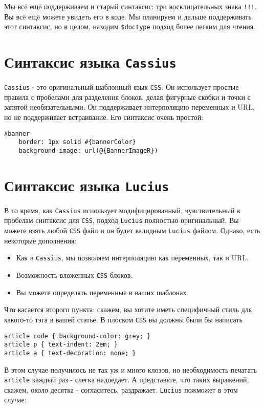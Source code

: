 Мы всë ещë поддерживаем и старый синтаксис: три восклицательных знака \texttt{!!!}.
Вы всë ещë можете увидеть его в коде. Мы планируем и дальше поддерживать этот
синтаксис, но в целом, находим \lstinline!$doctype! подход более легким для чтения.

\section{Синтаксис языка \texttt{Cassius}}
\texttt{Cassius} - это оригинальный шаблонный язык \texttt{CSS}. Он использует простые правила
с пробелами для разделения блоков, делая фигурные скобки и точки с запятой
необязательными. Он поддерживает интерполяцию переменных и URL, но не поддерживает
встраивание. Его синтаксис очень простой:

\begin{lstlisting}
#banner
    border: 1px solid #{bannerColor}
    background-image: url(@{BannerImageR})
\end{lstlisting}

\section{Синтаксис языка \texttt{Lucius}}
В то время, как \texttt{Cassius} использует модифицированный, чувствительный к пробелам
синтаксис для \texttt{CSS}, подход \texttt{Lucius} полностью оригинальный. Вы можете взять любой \texttt{CSS}
файл и он будет валидным \texttt{Lucius} файлом. Однако, есть некоторые дополнения:

\begin{itemize}
\item Как в \texttt{Cassius}, мы позволяем интерполяцию как переменных, так и URL.
\item Возможность вложенных \texttt{CSS} блоков.
\item Вы можете определять переменные в ваших шаблонах.
\end{itemize}

Что касается второго пункта: скажем, вы хотите иметь специфичный стиль для
какого-то тэга в вашей статье. В плоском \texttt{CSS} вы должны были бы написать

\begin{lstlisting}
article code { background-color: grey; }
article p { text-indent: 2em; }
article a { text-decoration: none; }
\end{lstlisting}

В этом случае получилось не так уж и много клозов, но необходимость печатать
\texttt{article} каждый раз - слегка надоедает. А представьте, что таких выражений,
скажем, около десятка - согласитесь, раздражает.
\texttt{Lucius} пожможет в этом случае:

